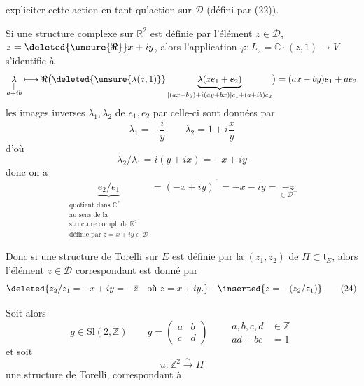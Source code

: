 expliciter cette action en tant qu'action sur $\mathscr D$ (défini par (22)).

Si une structure complexe sur $\mathbb R^2$ est définie par l'élément $z\in\mathscr D$, $z=\deleted{\unsure{\Re}}x+iy$, alors l'application  $\varphi\colon L_z=\mathbb C\cdot(z,1)\longrightarrow V$ s'identifie à
\[
 \underset{\substack{\Vert\\a+ib}}{\lambda}\longmapsto
 \Re\bigl(\deleted{\unsure{\lambda(z,1)}}\underbrace{\lambda(ze_1+e_2)}_{[(ax-by)+i(ay+bx)]e_1+(a+ib)e_2}\bigr)=(ax-by)e_1+ae_2
\]
les images inverses $\lambda_1,\lambda_2$ de $e_1,e_2$ par celle-ci sont données par
\[
 \lambda_1=-\frac{i}{y}\qquad\lambda_2=1+i\frac{x}{y}
\]
d'où
\[
 \lambda_2/\lambda_1=i(y+ix)=-x+iy
\]
donc on a
\[
 \underbrace{e_2/e_1}_{\substack{\text{quotient dans }\mathbb C^*\\
 \text{au sens de la}\\\text{structure compl. de }\mathbb R^2\\
 \text{définie par }z=x+iy\in\mathscr D}}
 =(-x+iy)^{\overline{\phantom{x}}}=-x-iy=\underset{\in\mathscr D^-}{-z}
\]

Donc si une structure de Torelli sur $E$ est définie par la  $(z_1,z_2)$ de $\Pi\subset\mathfrak t_E$, alors l'élément $z\in\mathscr D$ correspondant est donné par
\[
 \deleted{z_2/z_1=-x+iy=-\bar z\quad\text{où }z=x+iy.}
 \quad\inserted{z=-(z_2/z_1)} \tag*{(24)}
\]

Soit alors
\[
 g\in\mathrm{Sl}(2,\mathbb Z)\qquad
 g=\begin{pmatrix}a&b\\c&d\end{pmatrix}\qquad
 \begin{aligned}a,b,c,d&\in\mathbb Z\\ad-bc&=1\end{aligned}
\]
et soit 
\[
 u\colon\mathbb Z^2\xrightarrow{\sim}\Pi
\]
une structure de Torelli, correspondant à
